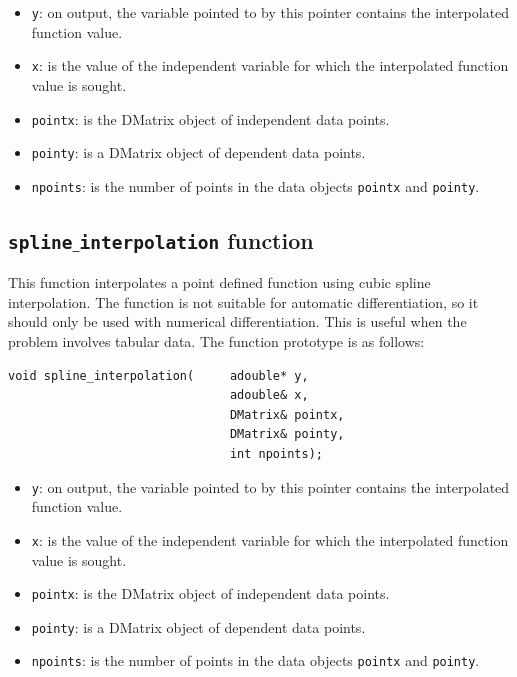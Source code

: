 \documentclass[a4paper,11pt]{report}    %
\begin{document}
\begin{itemize}
 \item \verb|y|: on output, the variable pointed to by this pointer contains the interpolated function value.
 \item \verb|x|: is the value of the independent variable for which the interpolated function value is sought.
 \item \verb|pointx|:  is the DMatrix object of independent data points.
 \item \verb|pointy|: is a DMatrix object of dependent data points.
 \item \verb|npoints|: is the number of points in the data objects \verb|pointx| and \verb|pointy|.
\end{itemize}


\subsection{ \texttt{spline$\_$interpolation} function}

This function interpolates a point defined function using cubic spline interpolation. The function is
not suitable for automatic differentiation, so it should only be used with numerical differentiation. 
This is useful when the problem involves tabular data.
The function prototype is as follows:

\begin{verbatim}
void spline_interpolation(     adouble* y, 
                               adouble& x, 
                               DMatrix& pointx, 
                               DMatrix& pointy, 
                               int npoints);
\end{verbatim}


\begin{itemize}
 \item \verb|y|: on output, the variable pointed to by this pointer contains the interpolated function value.
 \item \verb|x|: is the value of the independent variable for which the interpolated function value is sought.
 \item \verb|pointx|:  is the DMatrix object of independent data points.
 \item \verb|pointy|: is a DMatrix object of dependent data points.
 \item \verb|npoints|: is the number of points in the data objects \verb|pointx| and \verb|pointy|.
\end{itemize}
\end{document}
